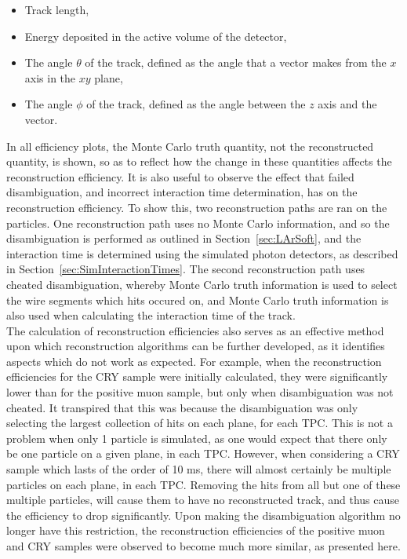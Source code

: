 \begin{itemize}
\item Track length,
\item Energy deposited in the active volume of the detector,
\item The angle $\theta$ of the track, defined as the angle that a vector makes from the $x$ axis in the $xy$ plane,
\item The angle $\phi$ of the track, defined as the angle between the $z$ axis and the vector.
\end{itemize}
In all efficiency plots, the Monte Carlo truth quantity, not the reconstructed quantity, is shown, so as to reflect how the change in these quantities affects the reconstruction efficiency. It is also useful to observe the effect that failed disambiguation, and incorrect interaction time determination, has on the reconstruction efficiency. To show this, two reconstruction paths are ran on the particles. One reconstruction path uses no Monte Carlo information, and so the disambiguation is performed as outlined in Section~\ref{sec:LArSoft}, and the interaction time is determined using the simulated photon detectors, as described in Section~\ref{sec:SimInteractionTimes}. The second reconstruction path uses cheated disambiguation, whereby Monte Carlo truth information is used to select the wire segments which hits occured on, and Monte Carlo truth information is also used when calculating the interaction time of the track. \\

The calculation of reconstruction efficiencies also serves as an effective method upon which reconstruction algorithms can be further developed, as it identifies aspects which do not work as expected. For example, when the reconstruction efficiencies for the CRY sample were initially calculated, they were significantly lower than for the positive muon sample, but only when disambiguation was not cheated. It transpired that this was because the disambiguation was only selecting the largest collection of hits on each plane, for each TPC. This is not a problem when only 1 particle is simulated, as one would expect that there only be one particle on a given plane, in each TPC. However, when considering a CRY sample which lasts of the order of 10 ms, there will almost certainly be multiple particles on each plane, in each TPC. Removing the hits from all but one of these multiple particles, will cause them to have no reconstructed track, and thus cause the efficiency to drop significantly. Upon making the disambiguation algorithm no longer have this restriction, the reconstruction efficiencies of the positive muon and CRY samples were observed to become much more similar, as presented here. \\

